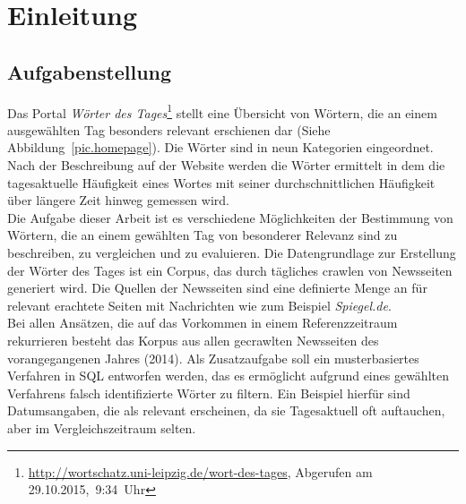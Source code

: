


\ourtitlepage 
\tableofcontents
{} %
\clearpage
{} %



\chapter{Einleitung}

\section{Aufgabenstellung}
Das Portal  \emph{Wörter des Tages}\footnote{\url{http://wortschatz.uni-leipzig.de/wort-des-tages}, Abgerufen am 29.10.2015,~9:34~Uhr} stellt eine Übersicht von Wörtern, die an einem ausgewählten Tag besonders relevant erschienen dar (Siehe Abbildung~\ref{pic.homepage}). Die Wörter sind in neun Kategorien eingeordnet. Nach der Beschreibung auf der Website werden die Wörter ermittelt in dem die tagesaktuelle Häufigkeit eines Wortes mit seiner durchschnittlichen Häufigkeit über längere Zeit hinweg gemessen wird.\\
Die Aufgabe dieser Arbeit ist es verschiedene Möglichkeiten der Bestimmung von Wörtern, die an einem gewählten Tag von besonderer Relevanz sind zu beschreiben, zu vergleichen und zu evaluieren. 
Die Datengrundlage zur Erstellung der Wörter des Tages ist ein Corpus, das durch tägliches crawlen von Newsseiten generiert wird. Die Quellen der Newsseiten sind eine definierte Menge an für relevant erachtete Seiten mit Nachrichten wie zum Beispiel \emph{Spiegel.de}.\\
Bei allen Ansätzen, die auf das Vorkommen in einem Referenzzeitraum rekurrieren besteht das Korpus aus allen gecrawlten Newsseiten des vorangegangenen Jahres (2014).
Als Zusatzaufgabe soll ein musterbasiertes Verfahren in SQL entworfen werden, das es ermöglicht aufgrund eines gewählten Verfahrens falsch identifizierte Wörter zu filtern. Ein Beispiel hierfür sind Datumsangaben, die als relevant erscheinen, da sie Tagesaktuell oft auftauchen, aber im Vergleichszeitraum selten.

